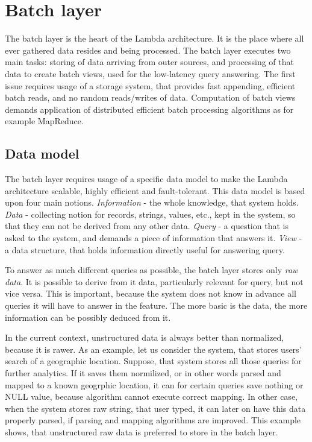 \section{Batch layer}

The batch layer is the heart of the Lambda architecture.
It is the place where all ever gathered data resides and being processed.
The batch layer executes two main tasks: storing of data arriving from outer sources, and processing of that data to create batch views, used for the low-latency query answering.
The first issue requires usage of a storage system, that provides fast appending, efficient batch reads, and no random reads/writes of data.
Computation of batch views demands application of distributed efficient batch processing algorithms as for example MapReduce.

\subsection{Data model}

The batch layer requires usage of a specific data model to make the Lambda architecture scalable, highly efficient and fault-tolerant.
This data model is based upon four main notions.
\textit{Information} - the whole knowledge, that system holds.
\textit{Data} - collecting notion for records, strings, values, etc., kept in the system, so that they can not be derived from any other data.
\textit{Query} - a question that is asked to the system, and demands a piece of information that answers it.
\textit{View} - a data structure, that holds information directly useful for answering query.

To answer as much different queries as possible, the batch layer stores only \textit{raw data}.
It is possible to derive from it data, particularly relevant for query, but not vice versa.
This is important, because the system does not know in advance all queries it will have to answer in the feature.
The more basic is the data, the more information can be possibly deduced from it.

In the current context, unstructured data is always better than normalized, because it is rawer.
As an example, let us consider the system, that stores users' search of a geographic location.
Suppose, that system stores all those queries for further analytics.
If it saves them normilized, or in other words parsed and mapped to a known geogrphic location, it can for certain queries save nothing or NULL value, because algorithm cannot execute correct mapping.
In other case, when the system stores raw string, that user typed, it can later on have this data properly parsed, if parsing and mapping algorithms are improved.
This example shows, that unstructured raw data is preferred to store in the batch layer.

